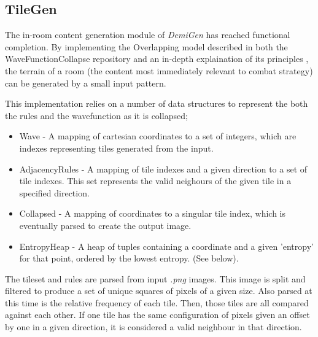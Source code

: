 \documentclass{article}
\begin{document}
\subsection{TileGen}
The in-room content generation module of \textit{DemiGen} has reached functional completion. By implementing the Overlapping model described in both the WaveFunctionCollapse\cite{wfc-report} repository and an in-depth explaination of its principles \cite{wfc-article}, the terrain of a room (the content most immediately relevant to combat strategy) can be generated by a small input pattern.




This implementation relies on a number of data structures to represent the both the rules and the wavefunction as it is collapsed;
\begin{itemize}
    \item Wave - A mapping of cartesian coordinates to a set of integers, which are indexes representing tiles generated from the input.
    \item AdjacencyRules - A mapping of tile indexes and a given direction to a set of tile indexes. This set represents the valid neighours of the given tile in a specified direction.
    \item Collapsed - A mapping of coordinates to a singular tile index, which is eventually parsed to create the output image.
    \item EntropyHeap - A heap of tuples containing a coordinate and a given 'entropy' for that point, ordered by the lowest entropy. (See below).
\end{itemize}
The tileset and rules are parsed from input \textit{.png} images. This image is split and filtered to produce a set of unique squares of pixels of a given size. Also parsed at this time is the relative frequency of each tile. Then, those tiles are all compared against each other. If one tile has the same configuration of pixels given an offset by one in a given direction, it is considered a valid neighbour in that direction.
\end{document}
